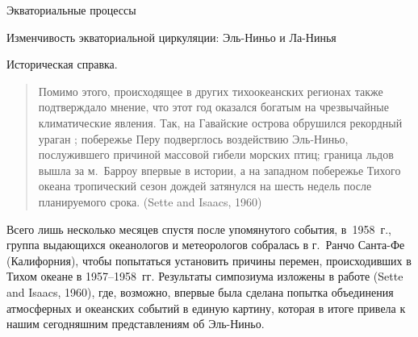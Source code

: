 \begin{chapter}{Экваториальные процессы}
\begin{section}{Изменчивость экваториальной циркуляции: Эль-Ниньо и Ла-Нинья}
\begin{paragraph}{Историческая справка.}
\begin{quotation}
Помимо этого, происходящее в других тихоокеанских регионах также подтверждало
мнение, что этот год оказался богатым на чрезвычайные климатические явления.
Так, на Гавайские острова обрушился рекордный ураган%
;
побережье Перу подверглось воздействию Эль-Ниньо, послужившего причиной 
массовой гибели морских птиц; граница льдов вышла за м.~Барроу впервые 
в истории, а на западном побережье Тихого океана тропический сезон дождей 
затянулся на шесть недель после планируемого 
срока. (Sette and Isaacs, 1960)
%
\end{quotation}

Всего лишь несколько месяцев спустя после упомянутого события, 
в~1958~г., группа выдающихся океанологов и метеорологов 
собралась в г.~Ранчо Санта-Фе (Калифорния), чтобы попытаться установить 
причины перемен, происходивших в Тихом океане в 1957--1958~гг. 
Результаты симпозиума изложены в работе (Sette and Isaacs, 1960), где, 
возможно, впервые была сделана попытка объединения атмосферных и океанских 
событий в единую картину, которая в итоге привела к нашим сегодняшним 
представлениям об Эль-Ниньо.
%


\end{paragraph}
\end{section}
\end{chapter}

